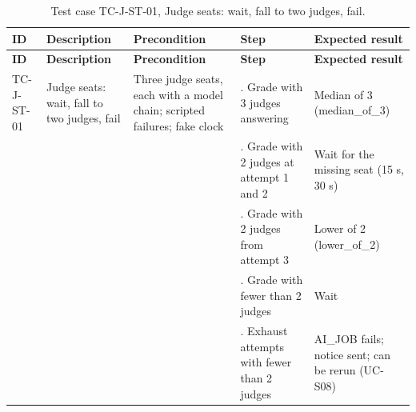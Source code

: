 {\small
\begin{longtable}{|>{\raggedright\arraybackslash}p{}|>{\raggedright\arraybackslash}p{}|>{\raggedright\arraybackslash}p{}|>{\raggedright\arraybackslash}p{}|>{\raggedright\arraybackslash}p{}|}
\caption{Test case TC-J-ST-01, Judge seats: wait, fall to two judges, fail.} \\
\hline
\textbf{ID} & \textbf{Description} & \textbf{Precondition} & \textbf{Step} & \textbf{Expected result} \\ \hline
\endfirsthead
\hline
\textbf{ID} & \textbf{Description} & \textbf{Precondition} & \textbf{Step} & \textbf{Expected result} \\ \hline
\endhead
TC-J-ST-01 & Judge seats: wait, fall to two judges, fail & Three judge seats, each with a model chain; scripted failures; fake clock & 1. Grade with 3 judges answering & Median of 3 (median\_of\_3) \\ \hline
 &  &  & 2. Grade with 2 judges at attempt 1 and 2 & Wait for the missing seat (15 s, 30 s) \\ \hline
 &  &  & 3. Grade with 2 judges from attempt 3 & Lower of 2 (lower\_of\_2) \\ \hline
 &  &  & 4. Grade with fewer than 2 judges & Wait \\ \hline
 &  &  & 5. Exhaust attempts with fewer than 2 judges & AI\_JOB fails; notice sent; can be rerun (UC-S08) \\ \hline
\end{longtable}
}

